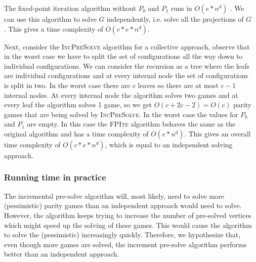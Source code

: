 The fixed-point iteration algorithm without $P_0$ and $P_1$ runs in $O(e*n^d)$ \cite{FPITE}. We can use this algorithm to solve $G$ independently, i.e. solve all the projections of $G$. This gives a time complexity of $O(c*e*n^d)$.

Next, consider the \textsc{IncPreSolve} algorithm for a collective approach, observe that in the worst case we have to split the set of configurations all the way down to individual configurations. We can consider the recursion as a tree where the leafs are individual configurations and at every internal node the set of configurations is split in two. In the worst case there are $c$ leaves so there are at most $c-1$ internal nodes. At every internal node the algorithm solves two games and at every leaf the algorithm solves 1 game, so we get $O(c + 2c - 2) = O(c)$ parity games that are being solved by \textsc{IncPreSolve}. In the worst case the values for $P_0$ and $P_1$ are empty. In this case the \textsc{FPIte} algorithm behaves the same as the original algorithm and has a time complexity of $O(e*n^d)$. This gives an overall time complexity of $O(c*e*n^d)$, which is equal to an independent solving approach.

\subsubsection{Running time in practice}
The incremental pre-solve algorithm will, most likely, need to solve more (pessimistic) parity games than an independent approach would need to solve. However, the algorithm keeps trying to increase the number of pre-solved vertices which might speed up the solving of these games. This would cause the algorithm to solve the (pessimistic) increasingly quickly. Therefore, we hypothesize that, even though more games are solved, the increment pre-solve algorithm performs better than an independent approach.